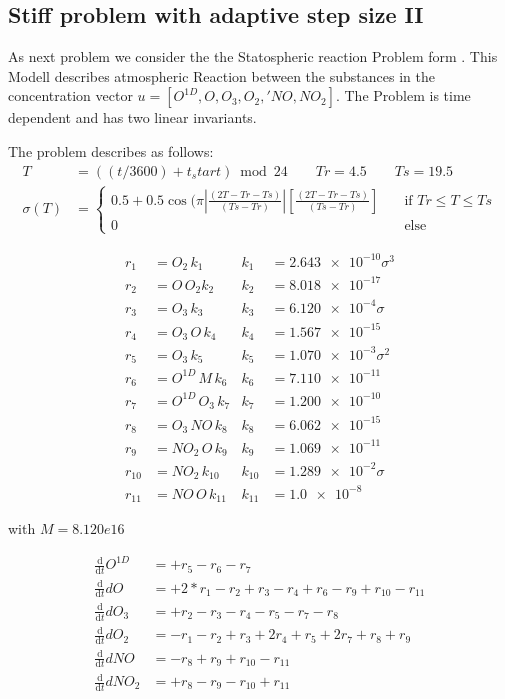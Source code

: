 \subsection{Stiff problem with adaptive step size II}

As next problem we consider the the Statospheric reaction Problem form \cite{sandu2001positive}.
This Modell describes atmospheric Reaction between the substances in the concentration vector $u=[O^{1D},O,O_3,O_2,'NO,NO_2]$. 
The Problem is time dependent and has two linear invariants.

The problem describes as follows:
\begin{align}
    T &= ((t/3600)+t_start) \bmod 24 
    \qquad  Tr = 4.5
    \qquad  Ts = 19.5 \\
    \sigma(T) &= 
     \begin{cases}
    0.5+0.5 \cos(\pi\left|\frac{(2T-Tr-Ts)}{(Ts-Tr)}\right| \left[\frac{(2T-Tr-Ts)}{(Ts-Tr)}\right]       & \quad \text{if } Tr \leq T \leq Ts\\
    0  & \quad \text{else } 
    \end{cases}
\end{align}


\begin{align}
r_1 &= O_2\,k_1       &  k_1 &= \num{2.643e-10} \sigma^3 \\
r_2 &= O\,O_2 k_2     &  k_2 &= \num{8.018e-17} \\
r_3 &= O_3\,k_3       &  k_3 &= \num{6.120e-4}\sigma \\
r_4 &= O_3\,O\,k_4     &  k_4 &= \num{1.567e-15} \\
r_5 &= O_3\,k_5       &  k_5 &= \num{1.070e-3}\sigma^2 \\
r_6&= O^{1D}\,M\,k_6     &  k_6 &= \num{7.110e-11} \\
r_7 &= O^{1D}\,O_3\,k_7   &  k_7 &= \num{1.200e-10} \\
r_8 &= O_3\,NO\,k_8    &  k_8 &= \num{6.062e-15} \\
r_9 &= NO_2\,O\,k_9    &  k_9 &= \num{1.069e-11} \\
r_{10}&=NO_2\,k_{10}  &  k_{10}&=\num{1.289e-2}\sigma \\
r_{11}&=NO\,O\,k_{11} &  k_{11}&=\num{1.0e-8}
\end{align}  

with $M  = 8.120e16$ 

\begin{align}
\frac{\mathrm d}{\mathrm d t}O^{1D}  &=   +r_5 -r_6 -  r_7 \\
\frac{\mathrm d}{\mathrm d t}dO   &=  +2*r_1 -r_2 +r_3 -  r_4  +r_6 -r_9 +r_{10} -r_{11} \\
\frac{\mathrm d}{\mathrm d t}dO_3  &=  +r_2 -r_3 -  r_4 -r_5  -r_7 -r_8 \\
\frac{\mathrm d}{\mathrm d t}dO_2  &=  -r_1 -r_2 +r_3 +2r_4 +r_5 +2r_7 +r_8 +r_9 \\
\frac{\mathrm d}{\mathrm d t}dNO  &=  -r_8 +r_9 +r_{10} -r_{11} \\
\frac{\mathrm d}{\mathrm d t}dNO_2 &=  +r_8 -r_9 -r_{10} +r_{11} 
\end{align}

